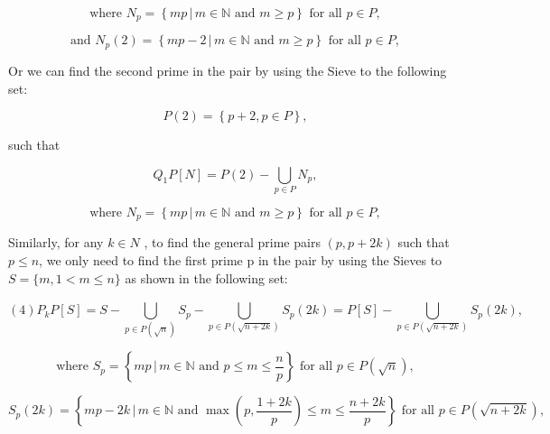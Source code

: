 \documentclass{article}
\begin{document}
\begin{equation}
\text{where } N_{p} = \left\{ mp \, | \, m \in \mathbb{N} \text{ and } m \geq p \right\} \text{ for all } p \in P,
\end{equation}

\begin{equation}
\text{and } N_{p}(2) = \left\{ mp-2 \, | \, m \in \mathbb{N} \text{ and } m \geq p \right\} \text{ for all } p \in P,
\end{equation}
\vspace{1\baselineskip}


Or we can find the second prime in the pair by using the Sieve to the following set: 

\begin{equation}
P(2) =\left\{  p+2,  p\in P\right\}  ,
\end{equation}



such that            

\begin{equation}
Q_{1}P[N] = P(2) - \bigcup_{p \in P} N_{p},
\end{equation}

\begin{equation}
\text{where } N_{p} = \left\{ mp \, | \, m \in \mathbb{N} \text{ and } m \geq p \right\} \text{ for all } p \in P,
\end{equation}

\vspace{1\baselineskip}

Similarly, for any \( k\in N\) {, to find the} general prime pairs \( (p,  p+2k)\) such that \( p\leq n\), we only need to find the first prime p in the pair by using  {the Sieves to }\( S = \{ m,  1<m\leq n\}\) as shown in the following set:

\begin{equation}
\left(4\right)                P_{k}P\left[S\right] =  S- \bigcup_{p\in P\left(\sqrt{n}\right)}^{} S_{p} - \bigcup_{p\in P\left(\sqrt{n+2k}\right)}^{}S_{p}\left(2k\right) =  P\left[S\right]- \bigcup_{p\in P\left(\sqrt{n+2k}\right)}^{}S_{p}\left(2k\right),
\end{equation}

\begin{equation}
\text{where } S_{p} = \left\{ mp \, | \, m \in \mathbb{N} \text{ and } p \leq m \leq \frac{n}{p} \right\} \text{ for all } p \in P(\sqrt{n}),
\end{equation}

\begin{equation}
S_{p}(2k) = \left\{ mp-2k \, | \, m \in \mathbb{N} \text{ and } \max\left( p, \frac{1+2k}{p} \right) \leq m \leq \frac{n+2k}{p} \right\} \text{ for all } p \in P(\sqrt{n+2k}),
\end{equation}
\end{document}
